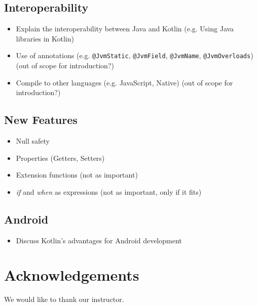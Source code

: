 \documentclass[a4paper, 11pt]{article}
\begin{document}
\subsection{Interoperability}
  \begin{itemize}
    \item Explain the interoperability between Java and Kotlin (e.g. Using Java libraries in Kotlin)
    \item Use of annotations (e.g. \texttt{@JvmStatic}, \texttt{@JvmField}, \texttt{@JvmName}, \texttt{@JvmOverloads}) (out of scope for introduction?)
    \item Compile to other languages (e.g. JavaScript, Native) (out of scope for introduction?)
  \end{itemize}

\subsection{New Features}
\begin{itemize}
  \item Null safety
  \item Properties (Getters, Setters)
  \item Extension functions (not as important)
  \item \textit{if} and \textit{when} as expressions (not as important, only if it fits)
\end{itemize}

\subsection{Android}
\begin{itemize}
  \item Discuss Kotlin's advantages for Android development
\end{itemize}

\section*{Acknowledgements}
  We would like to thank our instructor.
\end{document}
